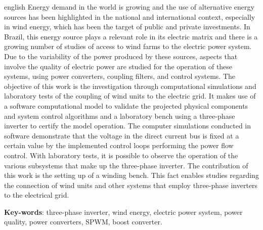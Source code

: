 \begin{resumo}[Abstract]
 \begin{otherlanguage*}{english}
Energy demand in the world is growing and the use of alternative energy sources has been highlighted 
in the national and international context, especially in wind energy, which has been the target of 
public and private investments.
In Brazil, this energy source plays a relevant role in its electric matrix and there is a growing number 
of studies of access to wind farms to the electric power system.
Due to the variability of the power produced by these sources, aspects that involve the quality of 
electric power are studied for the operation of these systems, using power converters, coupling 
filters, and control systems.
The objective of this work is the investigation through computational simulations and laboratory 
tests of the coupling of wind units to the electric grid.
It makes use of a software computational model to validate the projected physical components and 
system control algorithms and a laboratory bench using a three-phase inverter to certify the model 
operation.
The computer simulations conducted in software demonstrate that the voltage in the direct current 
bus is fixed at a certain value by the implemented control loops performing the power flow control.
With laboratory tests, it is possible to observe the operation of the various subsystems that make 
up the three-phase inverter.
The contribution of this work is the setting up of a winding bench. This fact enables studies 
regarding the connection of wind units and other systems that employ three-phase inverters to the 
electrical grid.

   \vspace{\onelineskip}
 
   \noindent 
   \textbf{Key-words}: three-phase inverter, wind energy, electric power system, power quality, power converters, SPWM, boost converter.
 \end{otherlanguage*}
\end{resumo}
